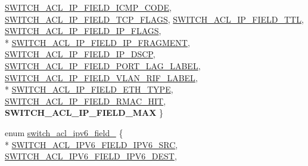 \begin{DoxyCompactItemize}
\hyperlink{group__ACL_ggace4560f87e18ccd1d8f9119fe7900fa1a4eac98b6c9408e9c49dff37114d87394}{S\+W\+I\+T\+C\+H\+\_\+\+A\+C\+L\+\_\+\+I\+P\+\_\+\+F\+I\+E\+L\+D\+\_\+\+I\+C\+M\+P\+\_\+\+C\+O\+D\+E}, 
\hyperlink{group__ACL_ggace4560f87e18ccd1d8f9119fe7900fa1a3a4489f0db1af1c9741d8971c419eb83}{S\+W\+I\+T\+C\+H\+\_\+\+A\+C\+L\+\_\+\+I\+P\+\_\+\+F\+I\+E\+L\+D\+\_\+\+T\+C\+P\+\_\+\+F\+L\+A\+G\+S}, 
\hyperlink{group__ACL_ggace4560f87e18ccd1d8f9119fe7900fa1adc405570376cbfe62926b8339f75cdf7}{S\+W\+I\+T\+C\+H\+\_\+\+A\+C\+L\+\_\+\+I\+P\+\_\+\+F\+I\+E\+L\+D\+\_\+\+T\+T\+L}, 
\hyperlink{group__ACL_ggace4560f87e18ccd1d8f9119fe7900fa1a28a252f58c242570b153a0b25e7e663d}{S\+W\+I\+T\+C\+H\+\_\+\+A\+C\+L\+\_\+\+I\+P\+\_\+\+F\+I\+E\+L\+D\+\_\+\+I\+P\+\_\+\+F\+L\+A\+G\+S}, 
\\*
\hyperlink{group__ACL_ggace4560f87e18ccd1d8f9119fe7900fa1a10fad1b46eff76029244cdaced0d1f2a}{S\+W\+I\+T\+C\+H\+\_\+\+A\+C\+L\+\_\+\+I\+P\+\_\+\+F\+I\+E\+L\+D\+\_\+\+I\+P\+\_\+\+F\+R\+A\+G\+M\+E\+N\+T}, 
\hyperlink{group__ACL_ggace4560f87e18ccd1d8f9119fe7900fa1a06d66e9c7e4cc40b96d4ec18c05e9fa2}{S\+W\+I\+T\+C\+H\+\_\+\+A\+C\+L\+\_\+\+I\+P\+\_\+\+F\+I\+E\+L\+D\+\_\+\+I\+P\+\_\+\+D\+S\+C\+P}, 
\hyperlink{group__ACL_ggace4560f87e18ccd1d8f9119fe7900fa1adfa073488e84e77694c5e64cbf369ad2}{S\+W\+I\+T\+C\+H\+\_\+\+A\+C\+L\+\_\+\+I\+P\+\_\+\+F\+I\+E\+L\+D\+\_\+\+P\+O\+R\+T\+\_\+\+L\+A\+G\+\_\+\+L\+A\+B\+E\+L}, 
\hyperlink{group__ACL_ggace4560f87e18ccd1d8f9119fe7900fa1ac5bbc97d40eff1cd8d5fddb59aa89c81}{S\+W\+I\+T\+C\+H\+\_\+\+A\+C\+L\+\_\+\+I\+P\+\_\+\+F\+I\+E\+L\+D\+\_\+\+V\+L\+A\+N\+\_\+\+R\+I\+F\+\_\+\+L\+A\+B\+E\+L}, 
\\*
\hyperlink{group__ACL_ggace4560f87e18ccd1d8f9119fe7900fa1a7137b32476c6fc4e7c990e6412c6d397}{S\+W\+I\+T\+C\+H\+\_\+\+A\+C\+L\+\_\+\+I\+P\+\_\+\+F\+I\+E\+L\+D\+\_\+\+E\+T\+H\+\_\+\+T\+Y\+P\+E}, 
\hyperlink{group__ACL_ggace4560f87e18ccd1d8f9119fe7900fa1a74f2a3bfa9478b1fe12bce38dda74d13}{S\+W\+I\+T\+C\+H\+\_\+\+A\+C\+L\+\_\+\+I\+P\+\_\+\+F\+I\+E\+L\+D\+\_\+\+R\+M\+A\+C\+\_\+\+H\+I\+T}, 
{\bfseries S\+W\+I\+T\+C\+H\+\_\+\+A\+C\+L\+\_\+\+I\+P\+\_\+\+F\+I\+E\+L\+D\+\_\+\+M\+A\+X}
 \}
\item 
enum \hyperlink{group__ACL_ga129df7ad73db6209bc9a5f28696408db}{switch\+\_\+acl\+\_\+ipv6\+\_\+field\+\_\+} \{ \\*
\hyperlink{group__ACL_gga129df7ad73db6209bc9a5f28696408dba8890631c9c1ba75bbefd6bd6018c1222}{S\+W\+I\+T\+C\+H\+\_\+\+A\+C\+L\+\_\+\+I\+P\+V6\+\_\+\+F\+I\+E\+L\+D\+\_\+\+I\+P\+V6\+\_\+\+S\+R\+C}, 
\hyperlink{group__ACL_gga129df7ad73db6209bc9a5f28696408dba9a4758d3a6482304721062c46add4173}{S\+W\+I\+T\+C\+H\+\_\+\+A\+C\+L\+\_\+\+I\+P\+V6\+\_\+\+F\+I\+E\+L\+D\+\_\+\+I\+P\+V6\+\_\+\+D\+E\+S\+T}, 

\end{DoxyCompactItemize}

